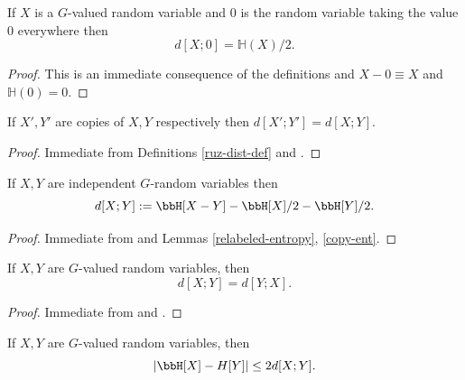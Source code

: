 \begin{lemma}\label{dist-zero}
  \leanok
If $X$ is a $G$-valued random variable and $0$ is the random variable taking the value $0$ everywhere then
\[d[X;0]=\mathbb{H}(X)/2.\]
\end{lemma}

\begin{proof}\leanok
This is an immediate consequence of the definitions and $X-0\equiv X$ and $\mathbb{H}(0)=0$.
\end{proof}

\begin{lemma}\label{ruz-copy}
  
  \leanok
  If $X',Y'$ are copies of $X,Y$ respectively then $d[X';Y']=d[X ;Y]$.
\end{lemma}

\begin{proof}\leanok Immediate from Definitions \ref{ruz-dist-def} and .
\end{proof}

\begin{lemma}\label{ruz-indep}
  
  \leanok
  If $X,Y$ are independent $G$-random variables then
  $$ d[X ;Y] := \bbH[X - Y] - \bbH[X]/2 - \bbH[Y]/2.$$
\end{lemma}

\begin{proof} \leanok Immediate from  and Lemmas \ref{relabeled-entropy}, \ref{copy-ent}.
\end{proof}

\begin{lemma}\label{ruzsa-symm}
  
  \leanok
  If $X,Y$ are $G$-valued random variables, then
  $$ d[X ;Y] = d[Y;X].$$
\end{lemma}

\begin{proof} \leanok Immediate from  and .
\end{proof}

\begin{lemma}\label{ruzsa-diff}
  \leanok
  If $X,Y$ are $G$-valued random variables, then
$$|\bbH[X]-H[Y]| \leq 2 d[X ;Y].$$
\end{lemma}

